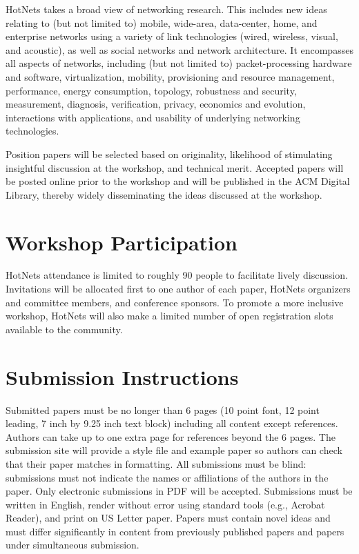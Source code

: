 \documentclass{hotnets16}
\begin{document}
HotNets takes a broad view of networking research. This includes new ideas relating to
(but not limited to) mobile, wide-area, data-center, home, and enterprise networks using a
variety of link technologies (wired, wireless, visual, and acoustic), as well as social networks
and network architecture. It encompasses all aspects of networks, including (but not limited to)
packet-processing hardware and software, virtualization, mobility, provisioning and resource management,
performance, energy consumption, topology, robustness and security, measurement, diagnosis,
verification, privacy, economics and evolution, interactions with applications, and usability
of underlying networking technologies.

Position papers will be selected based on originality, likelihood of
stimulating insightful discussion at the workshop, and technical
merit. Accepted papers will be posted online prior to the workshop and
will be published in the ACM Digital Library, thereby widely
disseminating the ideas discussed at the workshop.

\section{Workshop Participation}

HotNets attendance is limited to roughly 90 people to facilitate
lively discussion. Invitations will be allocated first to one author
of each paper, HotNets organizers and committee members, and
conference sponsors. To promote a more inclusive workshop, HotNets
will also make a limited number of open registration slots available
to the community.  

\section{Submission Instructions}

Submitted papers must be no longer than 6 pages (10 point font, 12
point leading, 7 inch by 9.25 inch text block) including all content except
references. Authors can take up to one extra page for references
beyond the 6 pages. The submission site will provide a style file and
example paper so authors can check that their paper matches in
formatting. All submissions must be blind: submissions must not
indicate the names or affiliations of the authors in the paper. Only
electronic submissions in PDF will be accepted. Submissions must be
written in English, render without error using standard tools (e.g.,
Acrobat Reader), and print on US Letter paper. Papers must contain
novel ideas and must differ significantly in content from previously
published papers and papers under simultaneous submission.
\end{document}
